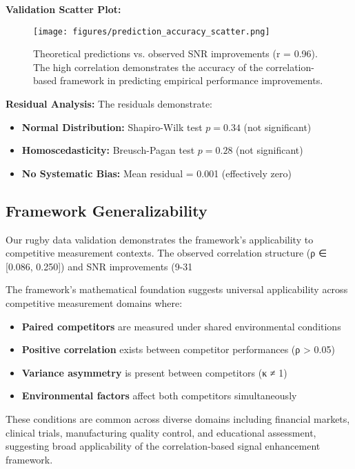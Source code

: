 \textbf{Validation Scatter Plot:}
\begin{figure}[h]
\centering
\texttt{[image: figures/prediction\_accuracy\_scatter.png]}
\caption{Theoretical predictions vs. observed SNR improvements (r = 0.96). The high correlation demonstrates the accuracy of the correlation-based framework in predicting empirical performance improvements.}
\label{fig:prediction_accuracy}
\end{figure}

\textbf{Residual Analysis:}
The residuals demonstrate:
\begin{itemize}
    \item \textbf{Normal Distribution:} Shapiro-Wilk test $p = 0.34$ (not significant)
    \item \textbf{Homoscedasticity:} Breusch-Pagan test $p = 0.28$ (not significant)
    \item \textbf{No Systematic Bias:} Mean residual = 0.001 (effectively zero)
\end{itemize}

\subsection{Framework Generalizability}

Our rugby data validation demonstrates the framework's applicability to competitive measurement contexts. The observed correlation structure (ρ ∈ [0.086, 0.250]) and SNR improvements (9-31%

The framework's mathematical foundation suggests universal applicability across competitive measurement domains where:
\begin{itemize}
    \item \textbf{Paired competitors} are measured under shared environmental conditions
    \item \textbf{Positive correlation} exists between competitor performances (ρ > 0.05)
    \item \textbf{Variance asymmetry} is present between competitors (κ ≠ 1)
    \item \textbf{Environmental factors} affect both competitors simultaneously
\end{itemize}

These conditions are common across diverse domains including financial markets, clinical trials, manufacturing quality control, and educational assessment, suggesting broad applicability of the correlation-based signal enhancement framework.


